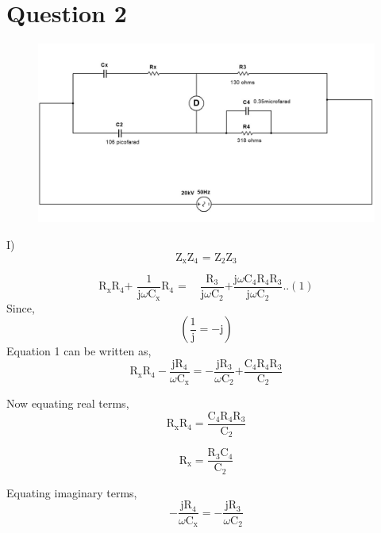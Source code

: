 \documentclass[12pt]{article}
\begin{document}
\section*{Question 2}
\begin{figure}[H]
	\includegraphics[width=\textwidth]{number2}
\end{figure}

I) \quad \[{{\text{Z}}_{\text{x}}}{{\text{Z}}_{\text{4}}}\text{ = }{{\text{Z}}_{\text{2}}}{{\text{Z}}_{\text{3}}} \]

\[ {{\text{R}}_{\text{x}}}{{\text{R}}_{\text{4}}}\text{+ }\frac{1}{\text{j}\omega {{\text{C}}_{\text{x}}}}{{\text{R}}_{\text{4}}}\text{ = }\!\!~\!\!\text{  }\frac{{{\text{R}}_{\text{3}}}}{\text{j}\omega {{\text{C}}_{\text{2}}}}\text{+}\frac{\text{j}\omega {{\text{C}}_{\text{4}}}{{\text{R}}_{\text{4}}}{{\text{R}}_{\text{3}}}}{\text{j}\omega {{\text{C}}_{\text{2}}}}..(1) 
	\]
Since,
 \[\left( \frac{\text{1}}{\text{j}}=-\text{j} \right) \]
Equation 1 can be written as,
\[{{\text{R}}_{\text{x}}}{{\text{R}}_{\text{4}}}-\frac{\text{j}{{\text{R}}_{\text{4}}}}{\omega {{\text{C}}_{\text{x}}}}=-\frac{\text{j}{{\text{R}}_{\text{3}}}}{\omega {{\text{C}}_{\text{2}}}}\text{+}\frac{{{\text{C}}_{\text{4}}}{{\text{R}}_{\text{4}}}{{\text{R}}_{\text{3}}}}{{{\text{C}}_{\text{2}}}}\]

Now equating real terms,
\[{{\text{R}}_{\text{x}}}{{\text{R}}_{\text{4}}}=\frac{{{\text{C}}_{\text{4}}}{{\text{R}}_{\text{4}}}{{\text{R}}_{\text{3}}}}{{{\text{C}}_{\text{2}}}} \]

\[ {{\text{R}}_{\text{x}}}=\frac{{{\text{R}}_{\text{3}}}{{\text{C}}_{\text{4}}}}{{{\text{C}}_{\text{2}}}} \]

Equating imaginary terms,
\[ -\frac{\text{j}{{\text{R}}_{\text{4}}}}{\omega {{\text{C}}_{\text{x}}}}=-\frac{\text{j}{{\text{R}}_{\text{3}}}}{\omega {{\text{C}}_{\text{2}}}}\]
\end{document}
